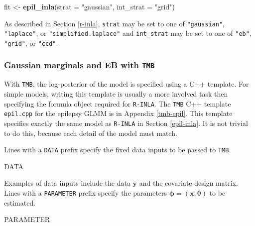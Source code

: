 \documentclass[a4paper, nobind]{templates/ociamthesis}
\newenvironment{Shaded}{\begin{snugshade}}{\end{snugshade}}
\newcommand{\AttributeTok}[1]{\textcolor[rgb]{0.13,0.29,0.53}{#1}}
\newcommand{\FunctionTok}[1]{\textcolor[rgb]{0.13,0.29,0.53}{\textbf{#1}}}
\newcommand{\NormalTok}[1]{#1}
\newcommand{\OtherTok}[1]{\textcolor[rgb]{0.56,0.35,0.01}{#1}}
\newcommand{\StringTok}[1]{\textcolor[rgb]{0.31,0.60,0.02}{#1}}
\renewenvironment{Shaded}
{
  \vspace{10pt}%
  \begin{snugshade}%
}{%
  \end{snugshade}%
  \vspace{8pt}%
}
\begin{document}
\begin{Shaded}
\begin{Highlighting}[]
\NormalTok{fit }\OtherTok{\textless{}{-}} \FunctionTok{epil\_inla}\NormalTok{(}\AttributeTok{strat =} \StringTok{"gaussian"}\NormalTok{, }\AttributeTok{int\_strat =} \StringTok{"grid"}\NormalTok{)}
\end{Highlighting}
\end{Shaded}

As described in Section \ref{r-inla}, \texttt{strat} may be set to one of \texttt{"gaussian"}, \texttt{"laplace"}, or \texttt{"simplified.laplace"} and \texttt{int\_strat} may be set to one of \texttt{"eb"}, \texttt{"grid"}, or \texttt{"ccd"}.

\hypertarget{epil-gauss-eb-tmb}{%
\subsubsection{\texorpdfstring{Gaussian marginals and EB with \texttt{TMB}}{Gaussian marginals and EB with TMB}}\label{epil-gauss-eb-tmb}}

With \texttt{TMB}, the log-posterior of the model is specified using a C++ template.
For simple models, writing this template is usually a more involved task then specifying the formula object required for \texttt{R-INLA}.
The \texttt{TMB} C++ template \texttt{epil.cpp} for the epilepsy GLMM is in Appendix \ref{tmb-epil}.
This template specifies exactly the same model as \texttt{R-INLA} in Section \ref{epil-inla}.
It is not trivial to do this, because each detail of the model must match.

Lines with a \texttt{DATA} prefix specify the fixed data inputs to be passed to \texttt{TMB}.

\begin{Shaded}
\begin{Highlighting}[]
\NormalTok{DATA}
\end{Highlighting}
\end{Shaded}

Examples of data inputs include the data \(\mathbf{y}\) and the covariate design matrix.
Lines with a \texttt{PARAMETER} prefix specify the parameters \(\boldsymbol{\mathbf{\phi}} = (\mathbf{x}, \boldsymbol{\mathbf{\theta}})\) to be estimated.

\begin{Shaded}
\begin{Highlighting}[]
\NormalTok{PARAMETER}
\end{Highlighting}
\end{Shaded}
\end{document}
